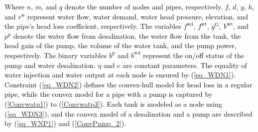 \documentclass[conference]{IEEEtran}
\begin{document}
\textcolor{black}{Where $n$, $m$, and $q$ denote the number of nodes and pipes, respectively. $f$, $d$, $y$, $h$, and $r^\mathrm{w}$ represent water flow, water demand, water head pressure, elevation, and the pipe's head loss coefficient, respectively. The variables $f^\mathrm{wd}$, $f^\mathrm{wt}$, $y^{\mathrm{G}}$, $V^\mathrm{wt}$, and $p^\mathrm{p}$ denote the water flow from desalination, the water flow from the tank, the head gain of the pump, the volume of the water tank, and the pump power, respectively. The binary variables $b^\mathrm{p}$ and $b^\mathrm{wd}$ represent the on/off status of the pump and water desalination. $\eta$ and $e$ are constant parameters. The equality of water injection and water output at each node is ensured by (\ref{eq_WDN1}). Constraint (\ref{eq_WDN2}) defines the convex-hull model for head loss in a regular pipe, while the convex model for a pipe with a pump is captured by (\ref{Convwatp1}) to (\ref{Convwatp3}). Each tank is modeled as a node using (\ref{eq_WDN3}), and the convex model of a desalination and a pump are described by (\ref{eq_WNP1}) and (\ref{ConvPump_2}).}
\end{document}
